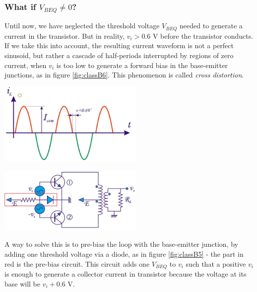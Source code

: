 \subsubsection{What if $V_{BEQ} \ne 0$?}
Until now, we have neglected the threshold voltage $V_{BEQ}$ needed to generate a current in the transistor. But in reality, $v_i > 0.6$ V before the transistor conducts. If we take this into account, the resulting current waveform is not a perfect sinusoid, but rather a cascade of half-periods interrupted by regions of zero current, when $v_i$ is too low to generate a forward bias in the base-emitter junctions, as in figure \ref{fig:classB6}. This phenomenon is called \emph{cross distortion}.\\
\begin{minipage}{.5\textwidth}
	\centering
	\includegraphics[width=7cm]{figures/ch09/classB6.jpg}
	\label{fig:classB6}
\end{minipage}%
\begin{minipage}{.5\textwidth}
	\centering
	\includegraphics[width=7cm]{figures/ch09/classB5.jpg}
	\label{fig:classB5}
\end{minipage}
A way to solve this is to pre-bias the loop with the base-emitter junction, by adding one threshold voltage via a diode, as in figure \ref{fig:classB5} - the part in red is the pre-bias circuit. This circuit adds one $V_{BEQ}$ to $v_i$ such that a positive $v_i$ is enough to generate a collector current in transistor  because the voltage at its base will be $v_i + 0.6$ V.

